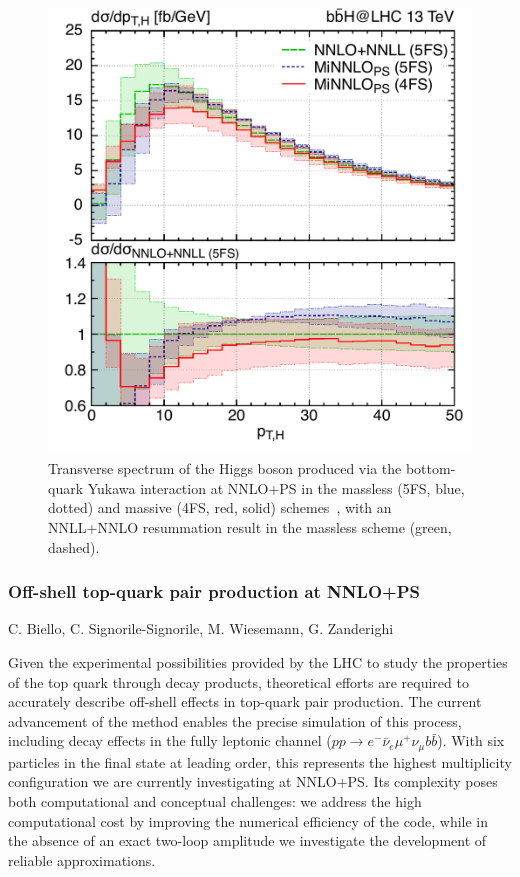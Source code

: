 \documentclass{FBR_Bericht_2025}
\begin{document}
\begin{refsection}
\begin{figure}[phtb]
\begin{center}
\includegraphics[width=0.95\linewidth]{plots/bbH__ptHspectrum.pdf}
\caption{Transverse spectrum of the Higgs boson produced via the bottom-quark Yukawa interaction at NNLO+PS in the massless (5FS, blue, dotted) and massive (4FS, red, solid) schemes~\cite{Biello:2024pgo}, with an NNLL+NNLO resummation result in the massless scheme (green, dashed).}
\label{phenofig:bbH}
\end{center}
\end{figure}
%
\subsubsection{Off-shell top-quark pair production at NNLO+PS}
\begin{Namen}
C. Biello, C. Signorile-Signorile, M. Wiesemann, G. Zanderighi
\end{Namen}
Given the experimental possibilities provided by the LHC to study the properties of the top quark through decay products, theoretical efforts are required to accurately describe off-shell effects in top-quark pair production. The current advancement of the \minnlo{} method enables the precise simulation of this process, including decay effects in the fully leptonic channel ($pp\rightarrow e^-\bar{\nu}_e\mu^+\nu_\mu b\bar b$). With six particles in the final state at leading order, this represents the highest multiplicity configuration we are currently investigating at NNLO+PS. Its complexity poses both computational and conceptual challenges: we address the high computational cost by improving the numerical efficiency of the code, while in the absence of an exact two-loop amplitude we investigate the development of reliable approximations.
% 

\end{refsection}
\end{document}
